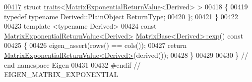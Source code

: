 \begin{DoxyCode}
\hyperlink{struct_eigen_1_1internal_1_1traits_3_01_matrix_exponential_return_value_3_01_derived_01_4_01_4}{00417} \textcolor{keyword}{struct }\hyperlink{struct_eigen_1_1internal_1_1traits}{traits}<\hyperlink{struct_eigen_1_1_matrix_exponential_return_value}{MatrixExponentialReturnValue}<Derived> >
00418 \{
00419   \textcolor{keyword}{typedef} \textcolor{keyword}{typename} Derived::PlainObject ReturnType;
00420 \};
00421 \}
00422 
00423 \textcolor{keyword}{template} <\textcolor{keyword}{typename} Derived>
00424 \textcolor{keyword}{const} \hyperlink{struct_eigen_1_1_matrix_exponential_return_value}{MatrixExponentialReturnValue<Derived>} 
      \hyperlink{group___core___module_class_eigen_1_1_matrix_base}{MatrixBase<Derived>::exp}()\textcolor{keyword}{ const}
00425 \textcolor{keyword}{}\{
00426   eigen\_assert(rows() == cols());
00427   \textcolor{keywordflow}{return} \hyperlink{struct_eigen_1_1_matrix_exponential_return_value}{MatrixExponentialReturnValue<Derived>}(derived());
00428 \}
00429 
00430 \} \textcolor{comment}{// end namespace Eigen}
00431 
00432 \textcolor{preprocessor}{#endif // EIGEN\_MATRIX\_EXPONENTIAL}
\end{DoxyCode}
